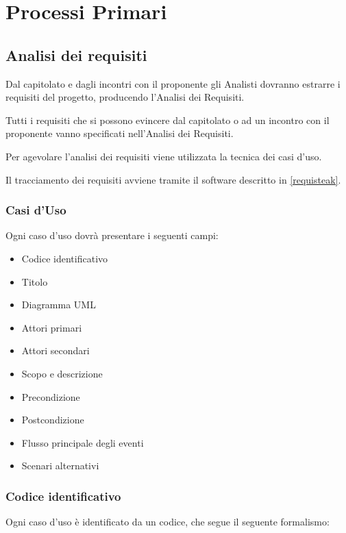 \section{Processi Primari}
\subsection{Analisi dei requisiti}

Dal capitolato e dagli incontri con il proponente gli Analisti dovranno estrarre i requisiti del progetto, producendo l'Analisi dei Requisiti.

Tutti i requisiti che si possono evincere dal capitolato o ad un incontro con il proponente vanno specificati nell'Analisi dei Requisiti.

Per agevolare l'analisi dei requisiti viene utilizzata la tecnica dei casi d'uso.

Il tracciamento dei requisiti avviene tramite il software descritto in \ref{requisteak}.

     
\subsubsection{Casi d'Uso}

Ogni caso d'uso dovrà presentare i seguenti campi:
\begin{itemize}
 \item Codice identificativo
 \item Titolo
 \item Diagramma UML
 \item Attori primari
 \item Attori secondari 
 \item Scopo e descrizione
 \item Precondizione
 \item Postcondizione
 \item Flusso principale degli eventi
 \item Scenari alternativi
\end{itemize}

\subsubsection{Codice identificativo}

Ogni caso d'uso è identificato da un codice, che segue il seguente formalismo:
\begin{center}
\end{center}

